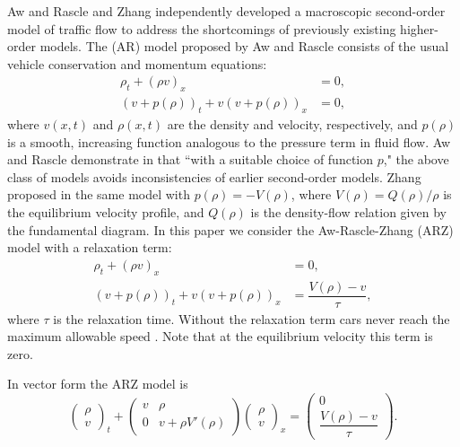 \documentclass[preprint]{elsarticle}
\begin{document}
Aw and Rascle \cite{AR} and Zhang \cite{Z} independently developed a macroscopic second-order model of traffic flow to address the shortcomings of previously existing higher-order models. The (AR) model proposed by Aw and Rascle consists of the usual vehicle conservation and momentum equations:
\begin{align} 
\rho_t + (\rho v)_x &= 0, \label{AR1} \\
(v + p(\rho))_t + v(v + p(\rho))_x &=0 \label{AR2},
\end{align}
where $v(x,t)$ and $\rho(x,t)$ are the density and velocity, respectively, and $p(\rho)$ is a smooth, increasing function analogous to the pressure term in fluid flow. Aw and Rascle demonstrate in \cite{AR} that ``with a suitable choice of function $p$," the above class of models avoids inconsistencies of earlier second-order models. 
Zhang proposed in \cite{Z} the same model with $p(\rho) = -V(\rho)$, where $V(\rho) = Q(\rho)/\rho$ is the equilibrium velocity profile, and $Q(\rho)$ is the density-flow relation given by the fundamental diagram. In this paper we consider the Aw-Rascle-Zhang (ARZ) model with a relaxation term:
\begin{align} 
\rho_t + (\rho v)_x &= 0, \label{ARZ1} \\
(v + p(\rho))_t + v(v + p(\rho))_x &=\dfrac{V(\rho) - v}{\tau} \label{ARZ2},
\end{align}
where $\tau$ is the relaxation time. Without the relaxation term cars never reach the maximum allowable speed \cite{R_improved}. Note that at the equilibrium velocity this term is zero. 

In vector form the ARZ model is
\begin{equation} \label{ARZrhov}
\begin{pmatrix}
\rho \\ v
\end{pmatrix}_t
+ \begin{pmatrix}
v & \rho \\
0 & v + \rho V' (\rho)
\end{pmatrix}
\begin{pmatrix}
\rho \\ v
\end{pmatrix}_x = 
\begin{pmatrix}
0 \\ \dfrac{V(\rho) - v}{\tau}
\end{pmatrix}.
\end{equation}
\end{document}
